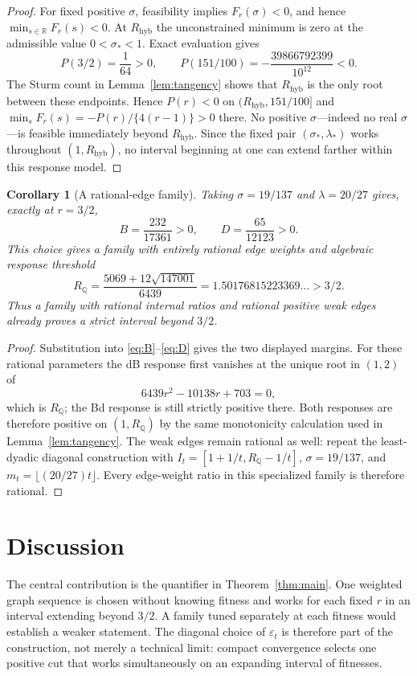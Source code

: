 \documentclass[11pt]{article}
\newtheorem{corollary}[theorem]{Corollary}
\theoremstyle{definition}
\theoremstyle{remark}
\newcommand{\Rhyb}{R_{\mathrm{hyb}}}
\newcommand{\eps}{\varepsilon}
\begin{document}
\begin{proof}
For fixed positive $\sigma$, feasibility implies $F_r(\sigma)<0$, and hence
$\min_{s\in\mathbb R}F_r(s)<0$.  At $\Rhyb$ the unconstrained minimum is
zero at the admissible value $0<\sigma_*<1$.  Exact evaluation gives
\[
 P(3/2)=\frac1{64}>0,\qquad
 P(151/100)=-\frac{39866792399}{10^{12}}<0.
\]
The Sturm count in Lemma~\ref{lem:tangency} shows that $\Rhyb$ is the only
root between these endpoints.  Hence $P(r)<0$ on
$(\Rhyb,151/100]$ and
$\min_sF_r(s)=-P(r)/\{4(r-1)\}>0$ there.  No positive $\sigma$---indeed no
real $\sigma$---is feasible immediately beyond $\Rhyb$.  Since the fixed
pair $(\sigma_*,\lambda_*)$ works throughout $(1,\Rhyb)$, no interval
beginning at one can extend farther within this response model.
\end{proof}

\begin{corollary}[A rational-edge family]
\label{cor:rational}
Taking $\sigma=19/137$ and $\lambda=20/27$ gives, exactly at $r=3/2$,
\[
 B=\frac{232}{17361}>0,\qquad
 D=\frac{65}{12123}>0.
\]
This choice gives a family with entirely rational edge weights and algebraic
response threshold
\[
 R_{\mathbb Q}
 =\frac{5069+12\sqrt{147001}}{6439}
 =1.50176815223369\ldots>3/2.
\]
Thus a family with rational internal ratios and rational positive weak edges
already proves a strict interval beyond $3/2$.
\end{corollary}

\begin{proof}
Substitution into \eqref{eq:B}--\eqref{eq:D} gives the two displayed
margins.  For these rational parameters the dB response first vanishes at
the unique root in $(1,2)$ of
\[
 6439r^2-10138r+703=0,
\]
which is $R_{\mathbb Q}$; the Bd response is still strictly positive there.
Both responses are therefore positive on $(1,R_{\mathbb Q})$ by the same
monotonicity calculation used in Lemma~\ref{lem:tangency}.  The weak edges
remain rational as well: repeat the least-dyadic diagonal construction with
$I_t=[1+1/t,R_{\mathbb Q}-1/t]$, $\sigma=19/137$, and
$m_t=\lfloor(20/27)t\rfloor$.  Every edge-weight ratio in this specialized
family is therefore rational.
\end{proof}

\section{Discussion}

The central contribution is the quantifier in Theorem~\ref{thm:main}.  One
weighted graph sequence is chosen without knowing fitness and works for each
fixed $r$ in an interval extending beyond $3/2$.  A family tuned separately
at each fitness would establish a weaker statement.  The diagonal choice of
$\eps_t$ is therefore part of the construction, not merely a technical
limit: compact convergence selects one positive cut that works
simultaneously on an expanding interval of fitnesses.
\end{document}
